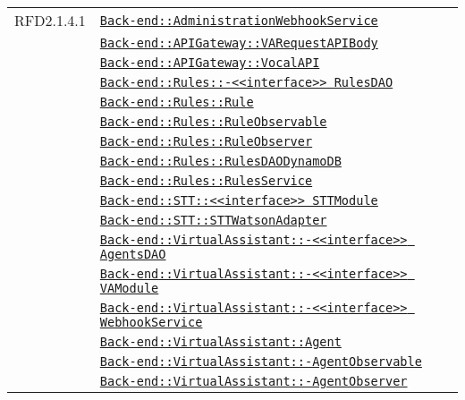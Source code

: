 \begin{longtable}{|>{\centering}m{3cm}|m{10cm}<{\centering}|}
RFD2.1.4.1 & \hyperref[Back-end::AdministrationWebhookService]{\texttt{Back-end::AdministrationWebhookService}}\\
& \hyperref[Back-end::APIGateway::VARequestAPIBody]{\texttt{Back-end::APIGateway::VARequestAPIBody}}\\
& \hyperref[Back-end::APIGateway::VocalAPI]{\texttt{Back-end::APIGateway::VocalAPI}}\\
& \hyperref[Back-end::Rules::<<interface>> RulesDAO]{\texttt{Back-end::Rules::-\linebreak <<interface>> RulesDAO}}\\
& \hyperref[Back-end::Rules::Rule]{\texttt{Back-end::Rules::Rule}}\\
& \hyperref[Back-end::Rules::RuleObservable]{\texttt{Back-end::Rules::RuleObservable}}\\
& \hyperref[Back-end::Rules::RuleObserver]{\texttt{Back-end::Rules::RuleObserver}}\\
& \hyperref[Back-end::Rules::RulesDAODynamoDB]{\texttt{Back-end::Rules::RulesDAODynamoDB}}\\
& \hyperref[Back-end::Rules::RulesService]{\texttt{Back-end::Rules::RulesService}}\\
& \hyperref[Back-end::STT::<<interface>> STTModule]{\texttt{Back-end::STT::<<interface>> STTModule}}\\
& \hyperref[Back-end::STT::STTWatsonAdapter]{\texttt{Back-end::STT::STTWatsonAdapter}}\\
& \hyperref[Back-end::VirtualAssistant::<<interface>> AgentsDAO]{\texttt{Back-end::VirtualAssistant::-\linebreak <<interface>> AgentsDAO}}\\
& \hyperref[Back-end::VirtualAssistant::<<interface>> VAModule]{\texttt{Back-end::VirtualAssistant::-\linebreak <<interface>> VAModule}}\\
& \hyperref[Back-end::VirtualAssistant::<<interface>> WebhookService]{\texttt{Back-end::VirtualAssistant::-\linebreak <<interface>> WebhookService}}\\
& \hyperref[Back-end::VirtualAssistant::Agent]{\texttt{Back-end::VirtualAssistant::Agent}}\\
& \hyperref[Back-end::VirtualAssistant::AgentObservable]{\texttt{Back-end::VirtualAssistant::-\linebreak AgentObservable}}\\
& \hyperref[Back-end::VirtualAssistant::AgentObserver]{\texttt{Back-end::VirtualAssistant::-\linebreak AgentObserver}}\\

\end{longtable}
